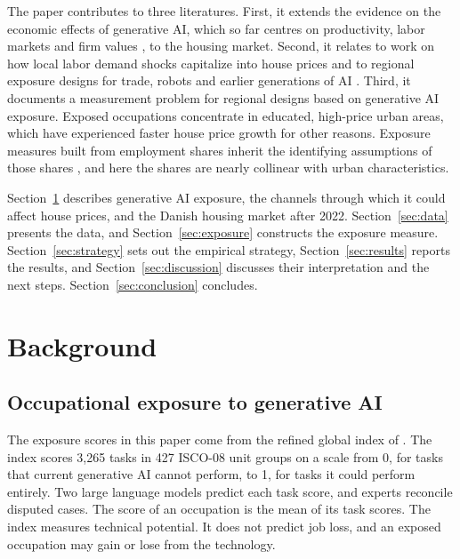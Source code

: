 \documentclass[12pt]{article}
\begin{document}
The paper contributes to three literatures. First, it extends the evidence on the economic effects of generative AI, which so far centres on productivity, labor markets and firm values \citep{noy2023, brynjolfsson2025, humlum2025, eisfeldt2023}, to the housing market. Second, it relates to work on how local labor demand shocks capitalize into house prices \citep{moretti2011, notowidigdo2020} and to regional exposure designs for trade, robots and earlier generations of AI \citep{autor2013, acemoglu2020robots, acemoglu2022ai}. Third, it documents a measurement problem for regional designs based on generative AI exposure. Exposed occupations concentrate in educated, high-price urban areas, which have experienced faster house price growth for other reasons. Exposure measures built from employment shares inherit the identifying assumptions of those shares \citep{goldsmithpinkham2020, borusyak2022}, and here the shares are nearly collinear with urban characteristics.

Section~\ref{sec:background} describes generative AI exposure, the channels through which it could affect house prices, and the Danish housing market after 2022. Section~\ref{sec:data} presents the data, and Section~\ref{sec:exposure} constructs the exposure measure. Section~\ref{sec:strategy} sets out the empirical strategy, Section~\ref{sec:results} reports the results, and Section~\ref{sec:discussion} discusses their interpretation and the next steps. Section~\ref{sec:conclusion} concludes.

\section{Background}\label{sec:background}

\subsection{Occupational exposure to generative AI}

The exposure scores in this paper come from the refined global index of \citet{gmyrek2025}. The index scores 3,265 tasks in 427 ISCO-08 unit groups on a scale from 0, for tasks that current generative AI cannot perform, to 1, for tasks it could perform entirely. Two large language models predict each task score, and experts reconcile disputed cases. The score of an occupation is the mean of its task scores. The index measures technical potential. It does not predict job loss, and an exposed occupation may gain or lose from the technology.
\end{document}
